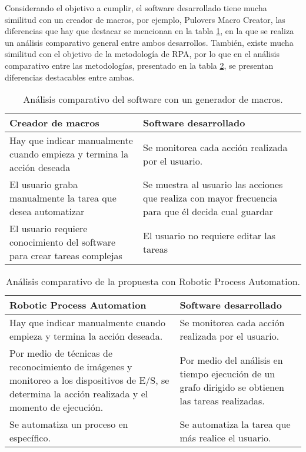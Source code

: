 Considerando el objetivo a cumplir, el software desarrollado tiene mucha 
 similitud con un creador de macros, por 
 ejemplo, Pulovers Macro Creator, las diferencias que hay que destacar se 
 mencionan en la tabla \ref{vsmacros}, en la que se realiza un an\'alisis 
 comparativo general entre ambos desarrollos. Tambi\'en, existe mucha 
 similitud con el objetivo de la metodolog\'ia de RPA, 
 por lo que en el an\'alisis 
 comparativo entre las metodolog\'ias, presentado en la tabla \ref{vsrpa}, se 
 presentan diferencias destacables entre ambas.
 

\begin{table}[h]
\centering
\begin{tabular}{m{6cm}|m{6cm}}
\hline
\textbf{Creador de macros} 	&	\textbf{Software desarrollado} \\
\hline
Hay que indicar manualmente cuando empieza y termina la acci\'on deseada	
 &	
Se monitorea cada acci\'on realizada por el usuario.\\
\hline

El usuario graba manualmente la tarea que desea automatizar	
 &
Se muestra al usuario las acciones que realiza con mayor frecuencia para que
  \'el decida cual guardar\\
\hline

El usuario requiere conocimiento del software para crear tareas complejas 	
 &
El usuario no requiere editar las tareas\\
\hline
\end{tabular}
\caption{An\'alisis comparativo del software con un generador de macros.}
\label{vsmacros}
\end{table}


\begin{table}[h]
\centering
\begin{tabular}{m{6cm}|m{6cm}}
\hline
\textbf{Robotic Process Automation}    &    \textbf{Software desarrollado} \\

\hline
Hay que indicar manualmente cuando empieza y termina la acci\'on deseada.
&
Se monitorea cada acci\'on realizada por el usuario.\\

\hline
Por medio de t\'ecnicas de reconocimiento de im\'agenes y monitoreo a los dispositivos de E/S, se determina la acci\'on realizada y el momento de ejecuci\'on. 
&
Por medio del an\'alisis en tiempo ejecuci\'on de un grafo dirigido se obtienen las tareas realizadas.\\

\hline
Se automatiza un proceso en espec\'ifico.
&
Se automatiza la tarea que m\'as realice el usuario.\\

\hline
\end{tabular}
\caption{An\'alisis comparativo de la propuesta con Robotic Process
 Automation.}
\label{vsrpa}
\end{table}


